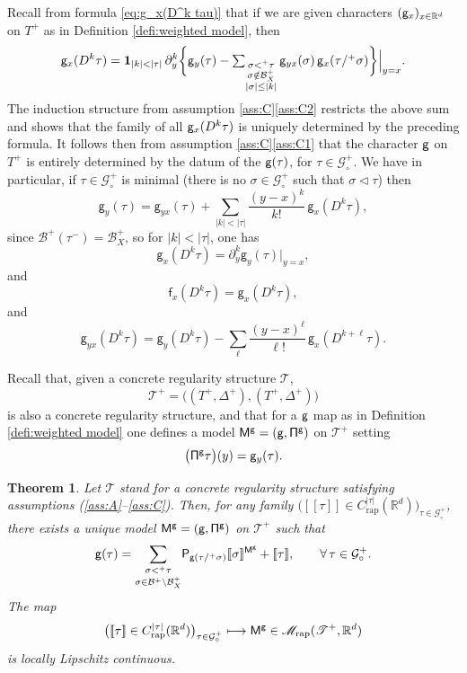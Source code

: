 \documentclass[10pt]{amsart}
\newcommand\mto{\mathchoice{\longmapsto}{\mapsto}{\mapsto}{\mapsto}}
\theoremstyle{plain}
\newtheorem{thm}{Theorem}
\theoremstyle{definition}
\newcommand{\unit}{\mathbf{1}}
\newcommand{\Brac}[1]{[\![#1]\!]}
\newcommand{\rap}{\mathrm{rap}}
\newcommand{\sfM}{\mathsf{M}}
\newcommand{\sfP}{\mathsf{P}}
\newcommand{\sff}{\mathsf{f}}
\newcommand{\sfg}{\mathsf{g}}
\newcommand{\scrM}{\mathscr{M}}
\newcommand{\scrT}{\mathscr{T}}
\let\spord\triangleleft
\newcommand{\bbR}{\mathbb{R}}
\newcommand{\mcB}{\mathcal{B}}
\newcommand{\mcG}{\mathcal{G}}
\begin{document}
Recall from formula \eqref{eq:g_x(D^k tau)} that if we are given characters $({\sf g}_x)_{x\in\bbR^d}$ on $T^+$ as in Definition \ref{defi:weighted model}, then
\begin{equation} \label{EqGxDkTau}
{\sf g}_x(D^k\tau) = \unit_{|k|<|\tau|}\, \partial_y^k\bigg\{\sfg_y(\tau) - \textstyle\sum_{\substack{\sigma<^+\tau\\\sigma\notin\mcB_X^+\\|\sigma| \le |k|}} \sfg_{yx}(\sigma)\,\sfg_x(\tau/^+\sigma)\bigg\}\Big|_{y=x}.
\end{equation}
The induction structure from assumption \ref{ass:C}\eqref{ass:C2} restricts the above sum and shows that the family of all ${\sf g}_x(D^k\tau)$ is uniquely determined by the preceding formula. It follows then from assumption \ref{ass:C}\eqref{ass:C1} that the character $\sf g$ on $T^+$ is entirely determined by the datum of the ${\sf g}(\tau)$, for $\tau\in\mcG_\circ^+$. We have in particular, if $\tau\in\mcG_\circ^+$ is minimal (\ie there is no $\sigma\in\mcG_\circ^+$ such that $\sigma\spord\tau$) then
\[
\sfg_y(\tau) = \sfg_{yx}(\tau) + \sum_{\vert k\vert<\vert\tau\vert}\frac{(y-x)^k}{k!}\,\sfg_x(D^k\tau),
\]
since $\mcB^+(\tau^-)=\mcB_X^+$, so for $\vert k\vert<\vert\tau\vert$, one has
\begin{equation} \label{EqDefnGD}
\sfg_x(D^k\tau) = \partial^k_y\sfg_y(\tau)\big\vert_{y=x},
\end{equation}
and
\[
\sff_x(D^k\tau) = \sfg_x(D^k\tau),
\]
and
\begin{equation} \label{EqDefnG2D}
\sfg_{yx}(D^k\tau) = \sfg_y(D^k\tau) - \sum_\ell \frac{(y-x)^\ell}{\ell !}\,\sfg_x(D^{k+\ell}\tau).
\end{equation}

Recall that, given a concrete regularity structure $\scrT$,
\[
\scrT^+ = \bigl((T^+,\Delta^+),(T^+,\Delta^+)\bigr)
\]
is also a concrete regularity structure, and that for a $\sf g$ map as in Definition \ref{defi:weighted model} one defines a model ${\sf M^g = (g,\Pi^g)}$ on $\scrT^+$ setting
\[
\bigl({\sf \Pi^g}\tau\bigr)(y) = {\sf g}_{y}(\tau).
\]

\begin{thm} \label{mainresult:reconst of g}
Let $\scrT$ stand for a concrete regularity structure satisfying assumptions \textup{(\ref{ass:A}--\ref{ass:C})}. Then, for any family $\bigl(\Brac{\tau}\in C^{|\tau|}_\rap(\bbR^d)\bigr)_{\tau\in\mcG^+_\circ}$, there exists a unique model $\sfM^{\sf g} = (\sfg,{\sf\Pi}^\sfg)$ on $\scrT^+$ such that
\begin{equation} \label{EqgTau}
{\sf g}(\tau) = \underset{\sigma\in\mcB^+\setminus \mcB_X^+}{\sum_{\sigma<^+\tau}} \sfP_{\sfg(\tau/^+\sigma)}\Brac{\sigma}^{{\sf M}^{\sfg}} + \Brac{\tau}, \qquad \forall\,\tau\in\mcG^+_\circ.
\end{equation}
The map
\begin{equation} \label{EqMap}
\bigl(\Brac{\tau}\in C^{|\tau|}_\rap(\bbR^d)\bigr)_{\tau\in\mcG^+_\circ} \mto {\sf M^g}\in\scrM_\rap(\scrT^+,\bbR^d)
\end{equation}
is locally Lipschitz continuous.
\end{thm}
\end{document}
